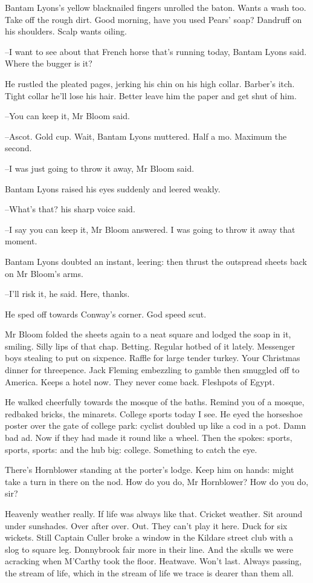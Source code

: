 Bantam Lyons's yellow blacknailed fingers unrolled the baton. Wants
a wash too. Take off the rough dirt. Good morning, have you used Pears'
soap? Dandruff on his shoulders. Scalp wants oiling.

--I want to see about that French horse that's running today, Bantam
Lyons said. Where the bugger is it?

He rustled the pleated pages, jerking his chin on his high collar.
Barber's itch. Tight collar he'll lose his hair. Better leave him the
paper and get shut of him.

--You can keep it, Mr Bloom said.

--Ascot. Gold cup. Wait, Bantam Lyons muttered. Half a mo. Maximum
the second.

--I was just going to throw it away, Mr Bloom said.

Bantam Lyons raised his eyes suddenly and leered weakly.

--What's that? his sharp voice said.

--I say you can keep it, Mr Bloom answered. I was going to throw it away
that moment.

Bantam Lyons doubted an instant, leering: then thrust the outspread
sheets back on Mr Bloom's arms.

--I'll risk it, he said. Here, thanks.

He sped off towards Conway's corner. God speed scut.

Mr Bloom folded the sheets again to a neat square and lodged the
soap in it, smiling. Silly lips of that chap. Betting. Regular hotbed of
it lately. Messenger boys stealing to put on sixpence. Raffle for large
tender turkey. Your Christmas dinner for threepence. Jack Fleming
embezzling to gamble then smuggled off to America. Keeps a hotel now. They
never come back. Fleshpots of Egypt.

He walked cheerfully towards the mosque of the baths. Remind you
of a mosque, redbaked bricks, the minarets. College sports today I see. He
eyed the horseshoe poster over the gate of college park: cyclist doubled
up like a cod in a pot. Damn bad ad. Now if they had made it round like a
wheel. Then the spokes: sports, sports, sports: and the hub big: college.
Something to catch the eye.

There's Hornblower standing at the porter's lodge. Keep him on
hands: might take a turn in there on the nod. How do you do, Mr
Hornblower? How do you do, sir?

Heavenly weather really. If life was always like that. Cricket weather.
Sit around under sunshades. Over after over. Out. They can't play it here.
Duck for six wickets. Still Captain Culler broke a window in the Kildare
street club with a slog to square leg. Donnybrook fair more in their line.
And the skulls we were acracking when M'Carthy took the floor.
Heatwave. Won't last. Always passing, the stream of life, which in the
stream of life we trace is dearer than them all.

